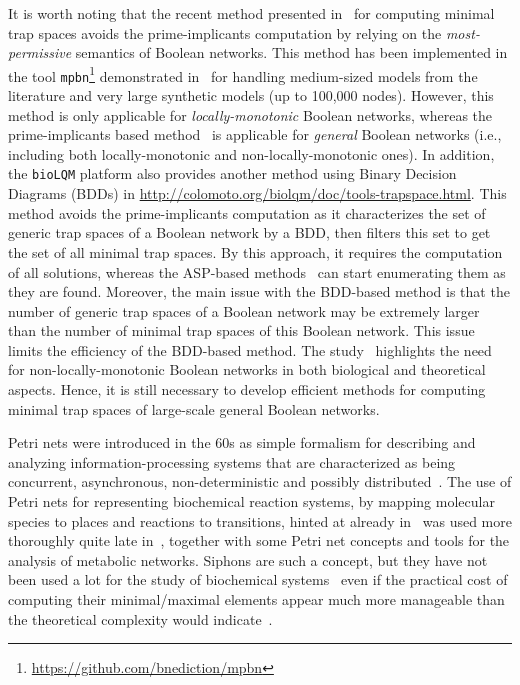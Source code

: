 \documentclass[preprint,12pt]{elsarticle}
\begin{document}
It is worth noting that the recent method presented in~\cite{DBLP:conf/ictai/ChevalierFPZ19} for computing minimal trap spaces avoids the prime-implicants computation by relying on the \emph{most-permissive} semantics of Boolean networks.
This method has been implemented in the tool \texttt{mpbn}\footnote{\url{https://github.com/bnediction/mpbn}} demonstrated in~\cite{Paulev2020} for handling medium-sized models from the literature and very large synthetic models (up to 100,000 nodes).
However, this method is only applicable for \emph{locally-monotonic} Boolean networks, whereas the prime-implicants based method~\cite{klarner2015computing} is applicable for \emph{general} Boolean networks (i.e., including both locally-monotonic and non-locally-monotonic ones).
In addition, the \texttt{bioLQM} platform also provides another method using Binary Decision Diagrams (BDDs) in \url{http://colomoto.org/biolqm/doc/tools-trapspace.html}.
This method avoids the prime-implicants computation as it characterizes the set of generic trap spaces of a Boolean network by a BDD, then filters this set to get the set of all minimal trap spaces.
By this approach, it requires the computation of all solutions, whereas the ASP-based methods~\cite{klarner2015computing,Paulev2020} can start enumerating them as they are found.
Moreover, the main issue with the BDD-based method is that the number of generic trap spaces of a Boolean network may be extremely larger than the number of minimal trap spaces of this Boolean network.
This issue limits the efficiency of the BDD-based method.
The study~\cite{DBLP:journals/tcs/NoualRS13} highlights the need for non-locally-monotonic Boolean networks in both biological and theoretical aspects.
Hence, it is still necessary to develop efficient methods for computing minimal trap spaces of large-scale general Boolean networks.

Petri nets were introduced in the 60s as simple formalism for describing and analyzing information-processing systems that are characterized as being concurrent, asynchronous, non-deterministic and possibly distributed~\cite{peterson1981petri,Murata1989}.
The use of Petri nets for representing biochemical reaction systems, by mapping molecular species to places and reactions to transitions, hinted at already in~\cite{peterson1981petri,Murata1989} was used more thoroughly quite late in~\cite{reddy1993petri}, together with some Petri net concepts and tools for the analysis of metabolic networks.
Siphons are such a concept, but they have not been used a lot for the study of biochemical systems~\cite{zevedei2003topological,blatke2015biomodel} even if the practical cost of computing their minimal/maximal elements appear much more manageable than the theoretical complexity would indicate~\cite{oanea2010new,nabli2016enumerating}.
\end{document}
